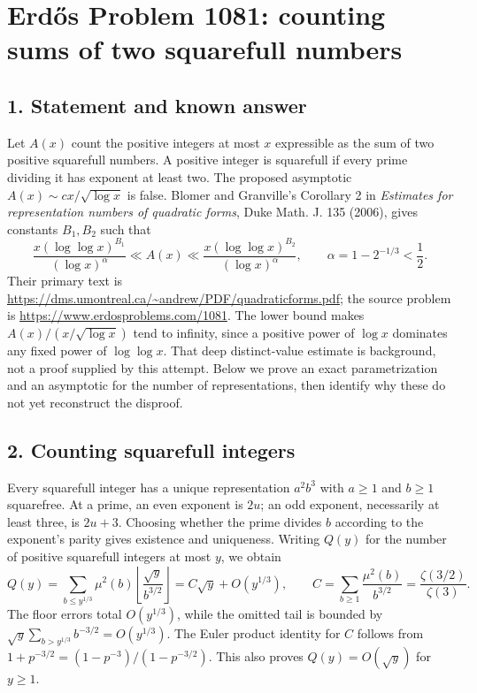 \section*{Erd\H{o}s Problem 1081: counting sums of two squarefull numbers}
\subsection*{1. Statement and known answer}
Let $A(x)$ count the positive integers at most $x$ expressible as the sum of two positive squarefull numbers. A positive integer is squarefull if every prime dividing it has exponent at least two. The proposed asymptotic $A(x)\sim cx/\sqrt{\log x}$ is false. Blomer and Granville's Corollary 2 in \emph{Estimates for representation numbers of quadratic forms}, Duke Math. J. 135 (2006), gives constants $B_1,B_2$ such that
\[
 \frac{x(\log\log x)^{B_1}}{(\log x)^\alpha}\ll A(x)\ll
 \frac{x(\log\log x)^{B_2}}{(\log x)^\alpha},\qquad \alpha=1-2^{-1/3}<\frac12.
\]
Their primary text is \url{https://dms.umontreal.ca/~andrew/PDF/quadraticforms.pdf}; the source problem is \url{https://www.erdosproblems.com/1081}. The lower bound makes $A(x)/(x/\sqrt{\log x})$ tend to infinity, since a positive power of $\log x$ dominates any fixed power of $\log\log x$.
That deep distinct-value estimate is background, not a proof supplied by this attempt. Below we prove an exact parametrization and an asymptotic for the number of representations, then identify why these do not yet reconstruct the disproof.

\subsection*{2. Counting squarefull integers}
Every squarefull integer has a unique representation $a^2b^3$ with $a\ge1$ and $b\ge1$ squarefree. At a prime, an even exponent is $2u$; an odd exponent, necessarily at least three, is $2u+3$. Choosing whether the prime divides $b$ according to the exponent's parity gives existence and uniqueness.
Writing $Q(y)$ for the number of positive squarefull integers at most $y$, we obtain
\[
 Q(y)=\sum_{b\le y^{1/3}}\mu^2(b)\left\lfloor\frac{\sqrt y}{b^{3/2}}\right\rfloor
 =C\sqrt y+O(y^{1/3}),\qquad C=\sum_{b\ge1}\frac{\mu^2(b)}{b^{3/2}}=\frac{\zeta(3/2)}{\zeta(3)}.
\]
The floor errors total $O(y^{1/3})$, while the omitted tail is bounded by $\sqrt y\sum_{b>y^{1/3}}b^{-3/2}=O(y^{1/3})$. The Euler product identity for $C$ follows from $1+p^{-3/2}=(1-p^{-3})/(1-p^{-3/2})$. This also proves $Q(y)=O(\sqrt y)$ for $y\ge1$.

